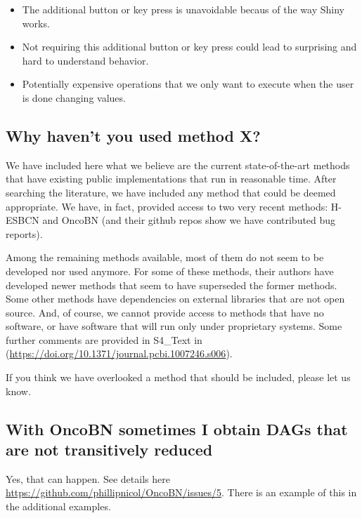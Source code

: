 \documentclass[a4paper,11pt]{article}
\begin{document}
\begin{itemize}
\item The additional button or key press is unavoidable becaus of the way Shiny works.

\item Not requiring this additional button or key press could lead to surprising and hard to understand behavior.
  
  \item Potentially expensive operations that we only want to execute when the user is done changing values.
\end{itemize}




 

\subsection{Why haven't you used method X?}\label{other_methods}

We have included here what we believe are the current state-of-the-art methods that have existing public implementations that run in reasonable time. After searching the literature, we have included any method that could be deemed appropriate. We have, in fact, provided access to two very recent methods: H-ESBCN and OncoBN (and their github repos show we have contributed bug reports).

Among the remaining methods available, most of them do not seem to be developed nor used anymore. For some of these methods, their authors have developed newer methods that seem to have superseded the former methods. Some other methods  have dependencies on external libraries that are not open source.  And, of course, we cannot provide access to methods that have no software, or have software that will run only under proprietary systems. Some further comments are provided in S4\_Text in \cite{diaz2019every} (\url{https://doi.org/10.1371/journal.pcbi.1007246.s006}).

If you think we have overlooked a method that should be included, please let us know.




\subsection{With OncoBN sometimes I obtain DAGs that are not transitively reduced}

Yes, that can happen. See details here \url{https://github.com/phillipnicol/OncoBN/issues/5}. There is an example of this in the additional examples.
\end{document}
